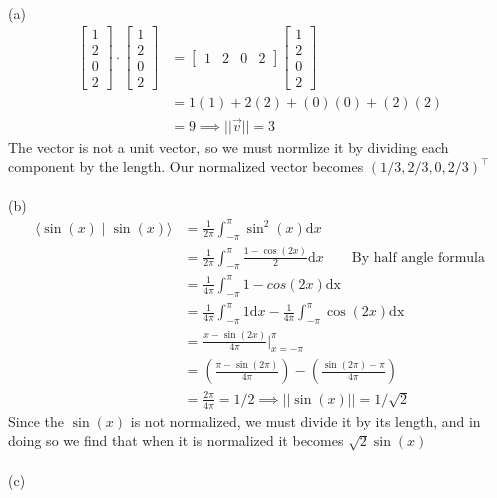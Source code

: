 \documentclass{report}
\begin{document}
\sol \\
(a)
$$
\begin{aligned}
\begin{bmatrix}1\\2\\0\\2\end{bmatrix}\cdot\begin{bmatrix}1\\2\\0\\2\end{bmatrix} & = \begin{bmatrix}1&2&0&2\end{bmatrix}\begin{bmatrix}1\\2\\0\\2\end{bmatrix}\\
&=1(1)+2(2)+(0)(0)+(2)(2)\\
&=9 \implies ||\vec{v}|| = 3
\end{aligned}
$$
The vector is not a unit vector,  so we must normlize it by dividing each component by the length.  Our normalized vector becomes $(1/3, 2/3, 0, 2/3)^\top$\\
\\
\noindent (b)
$$
\begin{aligned}
\langle \sin(x) \mid \sin(x) \rangle &= \frac{1}{2\pi} \int_{-\pi}^\pi \sin^2(x)\mathrm{d}x\\
&=\frac{1}{2\pi}\int_{-\pi}^\pi \frac{1-\cos(2x)}{2}\mathrm{d}x \qquad \text{By half angle formula}\\
&=\frac{1}{4\pi}\int_{-\pi}^\pi 1-cos(2x)\mathrm{dx}\\
&=\frac{1}{4\pi}\int_{-\pi}^\pi1\mathrm{d}x-\frac{1}{4\pi}\int_{-\pi}^\pi\cos(2x)\mathrm{dx}\\
&=\frac{x-\sin(2x)}{4\pi}\biggr\rvert_{x=-\pi}^\pi\\
&=\left(\frac{\pi-\sin(2\pi)}{4\pi}\right)-\left(\frac{\sin(2\pi)-\pi}{4\pi}\right)\\
&=\frac{2\pi}{4\pi} = 1/2 \implies ||\sin(x)|| = 1/\sqrt{2}
\end{aligned}
$$
Since the $\sin(x)$ is not normalized,  we must divide it by its length,  and in doing so we find that when it is normalized it becomes $\sqrt{2}\sin(x)$\\
\\
\noindent(c)
\end{document}
